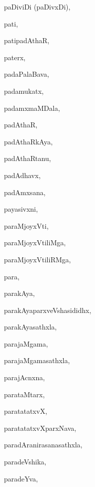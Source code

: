 \begin{multicols}{3}
{\noindent
{paDiviDi (paDivxDi)}, \pageref{paDiviDipaDivxDi}

\noindent
{pati}, \pageref{pati}

\noindent
{patipadAthaR}, \pageref{patipadAthaR}

\noindent
{paterx}, \pageref{paterx}

\noindent
{padaPalaBava}, \pageref{padaPalaBava}

\noindent
{padamukatx}, \pageref{padamukatx}

\noindent
{padamxmaMDala}, \pageref{padamxmaMDala}

\noindent
{padAthaR}, \pageref{padAthaR}

\noindent
{padAthaRkAya}, \pageref{padAthaRkAya}

\noindent
{padAthaRtanu}, \pageref{padAthaRtanu}

\noindent
{padAdhavx}, \pageref{padAdhavx}

\noindent
{padAmxsana}, \pageref{padAmxsana}

\noindent
{payasivxni}, \pageref{payasivxni}

\noindent
{paraMjoyxVti}, \pageref{paraMjoyxVti}

\noindent
{paraMjoyxVtiliMga}, \pageref{paraMjoyxVtiliMga}

\noindent
{paraMjoyxVtiliRMga}, \pageref{paraMjoyxVtiliRMga}

\noindent
{para}, \pageref{para}

\noindent
{parakAya}, \pageref{parakAya}

\noindent
{parakAyaparxveVshasididhx}, \pageref{parakAyaparxveVshasididhx}

\noindent
{parakAyasathxla}, \pageref{parakAyasathxla}

\noindent
{parajaMgama}, \pageref{parajaMgama}

\noindent
{parajaMgamasathxla}, \pageref{parajaMgamasathxla}

\noindent
{parajAcnxna}, \pageref{parajAcnxna}

\noindent
{parataMtarx}, \pageref{parataMtarx}

\noindent
{paratatatxvX}, \pageref{paratatatxvX}

\noindent
{paratatatxvXparxNava}, \pageref{paratatatxvXparxNava}

\noindent
{paradAranirasanasathxla}, \pageref{paradAranirasanasathxla}

\noindent
{paradeVshika}, \pageref{paradeVshika}

\noindent
{paradeYva}, \pageref{paradeYva}

}
\end{multicols}

